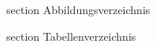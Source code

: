 \listoffigures
{} {section} {Abbildungsverzeichnis}

\newpage

\listoftables
{} {section} {Tabellenverzeichnis}